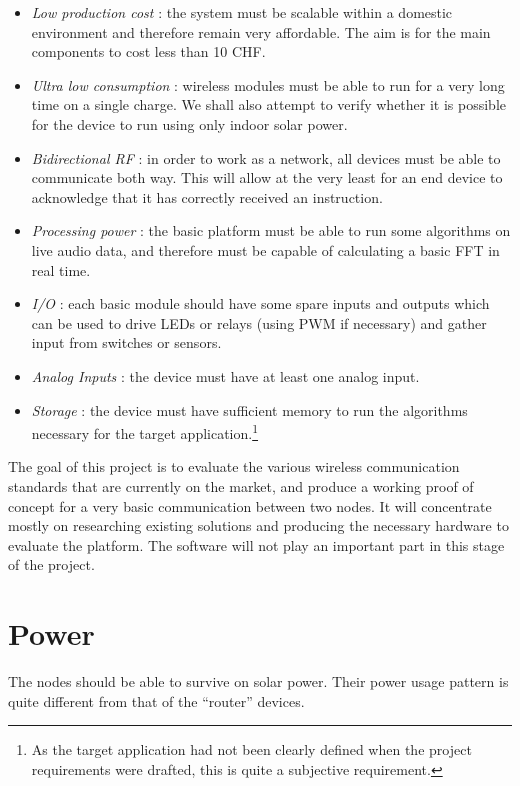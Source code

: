 \begin{itemize}
  \item \emph{Low production cost} : the system must be scalable within
    a domestic environment and therefore remain very affordable. The aim is for
    the main components to cost less than 10 CHF. %
  \item \emph{Ultra low consumption} : wireless modules must be able to run for
    a very long time on a single charge. We shall also attempt to verify
    whether it is possible for the device to run using only indoor solar power.
  \item \emph{Bidirectional RF} : %
    in order to work as a network, all devices must be able to communicate both
    way. This will allow at the very least for an end device to acknowledge
    that it has correctly received an instruction.
  \item \emph{Processing power} : the basic platform must be able to run some
    algorithms on live audio data, and therefore must be capable of calculating
    a basic \ac{FFT} in real time.
  \item \emph{I/O} : each basic module should have some spare inputs and
    outputs which can be used to drive LEDs or relays (using \ac{PWM} if
    necessary) and gather input from switches or sensors.
  \item \emph{Analog Inputs} : the device must have at least one analog input.
  \item \emph{Storage} : the device must have sufficient memory to run the
    algorithms necessary for the target application.\footnote{As the target
    application had not been clearly defined when the project requirements were
    drafted, this is quite a subjective requirement.}
\end{itemize}

The goal of this project is to evaluate the various wireless communication
standards that are currently on the market, and produce a working proof of
concept for a very basic communication between two nodes. It will concentrate
mostly on researching existing solutions and producing the necessary hardware to
evaluate the platform. The software will not play an important part in this
stage of the project.

\section{Power}\label{sec:power}


The nodes should be able to survive on solar power. Their power usage pattern
is quite different from that of the ``router'' devices. %
